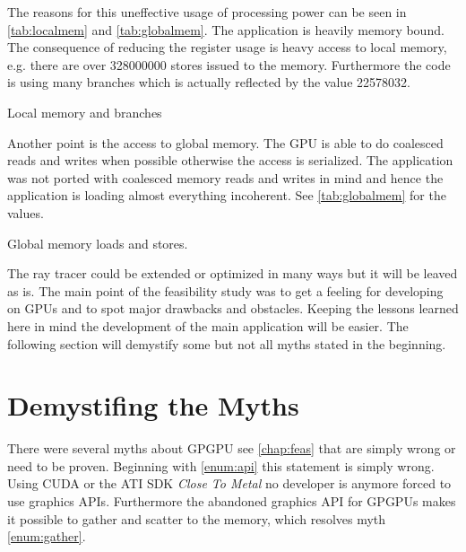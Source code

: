 The reasons for this uneffective usage of processing power can be seen in
\autoref{tab:localmem} and \autoref{tab:globalmem}. The application is heavily
memory bound. The consequence of reducing the register usage is heavy access to
local memory, e.g. there are over 328000000 stores issued to the memory.
Furthermore the code is using many branches which is actually reflected by the
value 22578032.


\begin{table}[ht]
	\centering
	\qquad
	
	\caption{Local memory and branches}
\end{table}

Another point is the access to global memory. The \gls{GPU} is able to do
coalesced reads and writes when possible otherwise the access is serialized. The
application was not ported with coalesced memory reads and writes in mind and
hence the application is loading almost everything incoherent. See
\autoref{tab:globalmem} for the values.

\begin{table}[ht]
    \centering
  	\caption[Global memory loads and stores]{Global memory loads and stores.}
  	\label{tab:globalmem}
\end{table}

The ray tracer could be extended or optimized in many ways but it will be leaved
as is. The main point of the feasibility study was to get a feeling for
developing on \glspl{GPU} and to spot major drawbacks and obstacles. Keeping the
lessons learned here in mind the development of the main application will be
easier. The following section will demystify some but not all myths stated in
the beginning.

\section{Demystifing the Myths} %
\label{sec:demystifing_the_myths}
There were several myths about \gls{GPGPU} see \autoref{chap:feas} that are
simply wrong or need to be proven. Beginning with \autoref{enum:api} this
statement is simply wrong. Using \gls{CUDA} or the ATI \gls{SDK} \emph{Close To
Metal} no developer is anymore forced to use graphics \glspl{API}. Furthermore
the abandoned graphics \gls{API} for \glspl{GPGPU} makes it possible to gather
and scatter to the memory, which resolves myth \autoref{enum:gather}.

